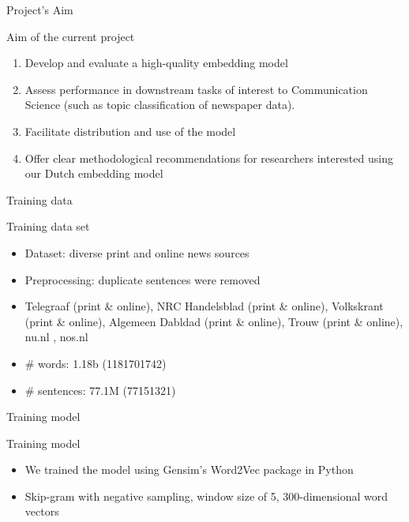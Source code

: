 \begin{frame}{Project's Aim}
	\begin{block}{Aim of the current project} 
		\begin{enumerate}
			\item Develop and evaluate a high-quality embedding model
			\item Assess performance in downstream tasks of interest to Communication Science (such as topic classification of newspaper data).
			\item Facilitate distribution and use of the model
			\item Offer clear methodological recommendations for researchers interested using our Dutch embedding model
		\end{enumerate}
	\end{block}
\end{frame}




\begin{frame}{Training data}
  \begin{block}{Training data set}
    \begin{itemize}
    \item Dataset: diverse print and online news sources
    \item Preprocessing: duplicate sentences were removed
    \item Telegraaf (print \& online), NRC Handelsblad (print \& online), Volkskrant (print \& online), Algemeen Dabldad (print \& online), Trouw (print \& online), nu.nl , nos.nl
    \item \# words: 1.18b (1181701742)
    \item \# sentences: 77.1M (77151321)
    \end{itemize}
  \end{block}
\end{frame}

\begin{frame}{Training model}
  \begin{block}{Training model}
    \begin{itemize}
    \item We trained the model using Gensim's Word2Vec package in Python
    \item Skip-gram with negative sampling, window size of 5, 300-dimensional word vectors
    \end{itemize}
  \end{block}
\end{frame}


